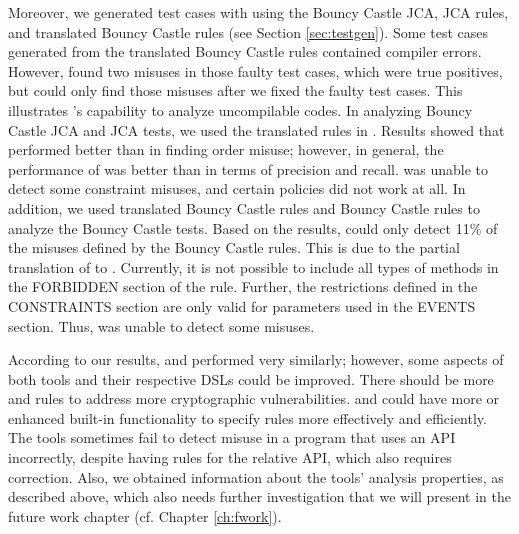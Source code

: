 Moreover, we generated test cases with \cognicrypttestgen{} using the Bouncy Castle JCA, JCA \crysl{} rules, and translated Bouncy Castle \crysl{} rules (see Section \ref{sec:testgen}). Some test cases generated from the translated Bouncy Castle \crysl{} rules contained compiler errors. However, \codyze{} found two misuses in those faulty test cases, which were true positives, but \cognicryptsast{} could only find those misuses after we fixed the faulty test cases. This illustrates \codyze's capability to analyze uncompilable codes. In analyzing Bouncy Castle JCA and JCA tests, we used the translated \MARK{} rules in \codyze. Results showed that \codyze{} performed better than \cognicryptsast{} in finding order misuse; however, in general, the performance of \cognicryptsast{} was better than \codyze{} in terms of precision and recall. \codyze{} was unable to detect some constraint misuses, and certain \MARK{} policies did not work at all. In addition, we used translated Bouncy Castle \crysl{} rules and Bouncy Castle \MARK{} rules to analyze the Bouncy Castle tests. Based on the results, \cognicryptsast{} could only detect 11\% of the misuses defined by the Bouncy Castle \MARK{} rules. This is due to the partial translation of \MARK{} to \crysl.  Currently, it is not possible to include all types of methods in the FORBIDDEN section of the \crysl{} rule. Further, the restrictions defined in the CONSTRAINTS section are only valid for parameters used in the EVENTS section. Thus, \cognicryptsast{} was unable to detect some misuses.

According to our results, \codyze{} and \cognicryptsast{} performed very similarly; however, some aspects of both tools and their respective DSLs could be improved. There should be more \MARK{} and \crysl{} rules to address more cryptographic vulnerabilities. \crysl{} and \MARK{} could have more or enhanced built-in functionality to specify rules more effectively and efficiently. The tools sometimes fail to detect misuse in a program that uses an API incorrectly, despite having rules for the relative API, which also requires correction. Also, we obtained information about the tools' analysis properties, as described above, which also needs further investigation that we will present in the future work chapter (cf. Chapter \ref{ch:fwork}).